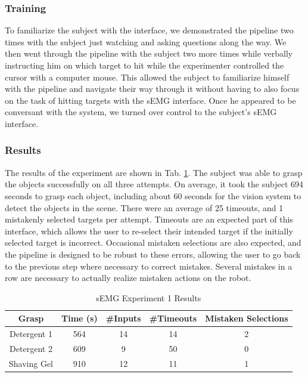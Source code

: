 \subsubsection{Training}
To familiarize the subject with the interface, we demonstrated the pipeline two times with the subject just watching and asking questions along the way. We then went through the pipeline with the subject two more times while verbally instructing him on which target to hit while the experimenter controlled the cursor with a computer mouse. This allowed the subject to familiarize himself with the pipeline and navigate their way through it without having to also focus on the task of hitting targets with the sEMG interface. Once he appeared to be conversant with the system, we turned over control to the subject's sEMG interface.

\subsubsection{Results}
The results of the experiment are shown in Tab. \ref{tab:semg_table_1}. The subject was able to grasp the objects successfully on all three attempts. On average, it took the subject 694 seconds to grasp each object, including about 60 seconds for the vision system to detect the objects in the scene. There were an average of 25 timeouts, and 1 mistakenly selected targets per attempt. Timeouts are an expected part of this interface, which allows the user to re-select their intended target if the initially selected target is incorrect. Occasional mistaken selections are also expected, and the pipeline is designed to be robust to these errors, allowing the user to go back to the previous step where necessary to correct mistakes. Several mistakes in a row are necessary to actually realize mistaken actions on the robot.


\begin{table}
\centering
\begin{tabular}{|c|c|c|c|c|}
\hline
Grasp & Time (s) & \#Inputs & \#Timeouts & Mistaken Selections \\ \hline
Detergent 1 & 564 & 14 & 14 & 2\\ \hline
Detergent 2 & 609 & 9 & 50 & 0\\ \hline
Shaving Gel & 910 & 12 & 11 & 1\\ \hline
\end{tabular}
\caption{sEMG Experiment 1 Results}
\label{tab:semg_table_1}
\end{table}


